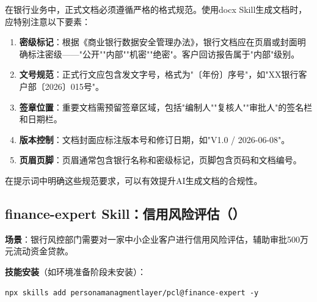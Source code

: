 \begin{theorybox}[银行文档规范要求]
在银行业务中，正式文档必须遵循严格的格式规范。使用docx Skill生成文档时，应特别注意以下要素：

\begin{enumerate}[leftmargin=1em]
  \item \textbf{密级标记}：根据《商业银行数据安全管理办法》，银行文档应在页眉或封面明确标注密级——"公开""内部""机密""绝密"。客户回访报告属于"内部"级别。
  \item \textbf{文号规范}：正式行文应包含发文字号，格式为"〔年份〕序号"，如"XX银行客户部〔2026〕015号"。
  \item \textbf{签章位置}：重要文档需预留签章区域，包括"编制人""复核人""审批人"的签名栏和日期栏。
  \item \textbf{版本控制}：文档封面应标注版本号和修订日期，如"V1.0 / 2026-06-08"。
  \item \textbf{页眉页脚}：页眉通常包含银行名称和密级标记，页脚包含页码和文档编号。
\end{enumerate}

在提示词中明确这些规范要求，可以有效提升AI生成文档的合规性。
\end{theorybox}

\subsection{finance-expert Skill：信用风险评估（）}

\textbf{场景}：银行风控部门需要对一家中小企业客户进行信用风险评估，辅助审批500万元流动资金贷款。

\textbf{技能安装}（如环境准备阶段未安装）：

\begin{lstlisting}[style=shell]
npx skills add personamanagmentlayer/pcl@finance-expert -y
\end{lstlisting}

